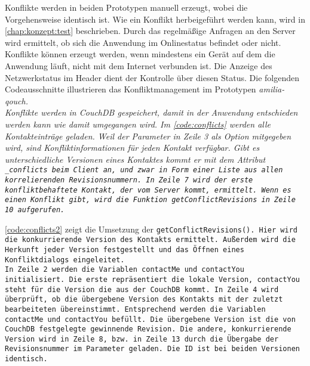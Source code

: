 Konflikte werden in beiden Prototypen manuell erzeugt, wobei die Vorgehensweise identisch ist.
Wie ein Konflikt herbeigeführt werden kann, wird in \autoref{chap:konzept:test} beschrieben.
Durch das regelmäßige Anfragen an den Server wird ermittelt, ob sich die Anwendung im Onlinestatus befindet oder nicht.
Konflikte können erzeugt werden, wenn mindestens ein Gerät auf dem die Anwendung läuft, nicht mit dem Internet verbunden ist.
Die Anzeige des Netzwerkstatus im Header dient der Kontrolle über diesen Status.
Die folgenden Codeausschnitte illustrieren das Konfliktmanagement im Prototypen \it{amilia-qouch}.\\
Konflikte werden in CouchDB gespeichert, damit in der Anwendung entschieden werden kann wie damit umgegangen wird.
Im \autoref{code:conflicts} werden alle Kontakteinträge geladen.
Weil der Parameter in Zeile 3 als Option mitgegeben wird, sind Konfliktinformationen für jeden Kontakt verfügbar.
Gibt es unterschiedliche Versionen eines Kontaktes kommt er mit dem Attribut \tt{\_conflicts} beim Client an, und zwar in Form einer Liste aus allen korrelierenden Revisionsnummern.
In Zeile 7 wird der erste konfliktbehaftete Kontakt, der vom Server kommt, ermittelt.
Wenn es einen Konflikt gibt, wird die Funktion \tt{getConflictRevisions} in Zeile 10 aufgerufen.
%
\begin{center}
  
\end{center}
%
\autoref{code:conflicts2} zeigt die Umsetzung der \tt{getConflictRevisions()}.
Hier wird die konkurrierende Version des Kontakts ermittelt.
Außerdem wird die Herkunft jeder Version festgestellt und das Öffnen eines Konfliktdialogs eingeleitet.\\
In Zeile 2 werden die Variablen \tt{contactMe} und \tt{contactYou} initialisiert.
Die erste repräsentiert die lokale Version, \tt{contactYou} steht für die Version die aus der CouchDB kommt.
In Zeile 4 wird überprüft, ob die übergebene Version des Kontakts mit der zuletzt bearbeiteten übereinstimmt.
Entsprechend werden die Variablen \tt{contactMe} und \tt{contactYou} befüllt.
Die übergebene Version ist die von CouchDB festgelegte gewinnende Revision.
Die andere, konkurrierende Version wird in Zeile 8, bzw. in Zeile 13 durch die Übergabe der Revisionsnummer im Parameter geladen.
Die ID ist bei beiden Versionen identisch.\\

